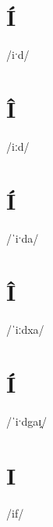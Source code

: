 \documentclass[10pt,a4paper,twoside]{book}
\begin{document}
\section*{Í}

\begin{multicols}{3}
 {/iˑd/} {}
\end{multicols}

\section*{Î}

\begin{multicols}{3}
 {/iːd/} {}
\end{multicols}

\section*{Í}

\begin{multicols}{3}
 {/ˈiˑda/} {}
\end{multicols}

\section*{Î}

\begin{multicols}{3}
 {/ˈiːdxa/} {}
\end{multicols}

\section*{Í}

\begin{multicols}{3}
 {/ˈiˑdgaɪ̯/} {}
\end{multicols}

\section*{I}

\begin{multicols}{3}
 {/if/} {}
\end{multicols}
\end{document}
